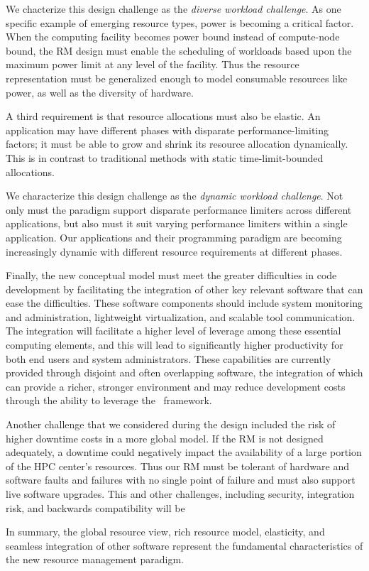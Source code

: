 We chacterize this design challenge as the {\em diverse workload
challenge}.   As one specific example of emerging resource types,
power is becoming a critical factor. When the computing facility
becomes power bound instead of compute-node bound, the RM design
must enable the scheduling of workloads based upon the maximum
power limit at any level of the facility. Thus the resource
representation must be generalized enough to model consumable
resources like power, as well as the diversity of hardware.

A third requirement is that resource allocations
must also be elastic. An application may have different
phases with disparate performance-limiting factors;
it must be able to grow and shrink its resource allocation
dynamically.  This is in contrast to traditional methods with
static time-limit-bounded allocations.

We characterize this design challenge as the {\em dynamic workload
challenge}.  
Not only must the paradigm support disparate performance limiters
across different applications, but also must it suit varying
performance limiters within a single application. Our applications
and their programming paradigm are becoming increasingly dynamic with
different resource requirements at different phases.

Finally, the new conceptual model must meet the greater difficulties
in code development by facilitating the integration 
of other key relevant software that can ease the difficulties. 
These software components should include system monitoring
and administration, lightweight virtualization,
and scalable tool communication.
The integration will facilitate a higher level of
leverage among these essential computing elements,
and this will lead to significantly higher productivity
for both end users and system administrators.
These capabilities are currently provided
through disjoint and often overlapping software,
the integration of which can provide a richer, stronger environment
and may reduce development costs through the ability to leverage
the \flux\ framework.

Another challenge that we considered during the design included
the risk of higher downtime costs in a more global model.
If the RM is not designed adequately, a downtime could negatively
impact the availability of a large portion of the HPC center’s
resources. Thus our RM must be tolerant of hardware and software
faults and failures with no single point of failure and must
also support live software upgrades. This and other challenges,
including security, integration risk, and backwards compatibility will be 

In summary, the global resource view, rich resource model,
elasticity, and seamless integration of other software 
represent the fundamental characteristics of the new
 resource management paradigm.  

